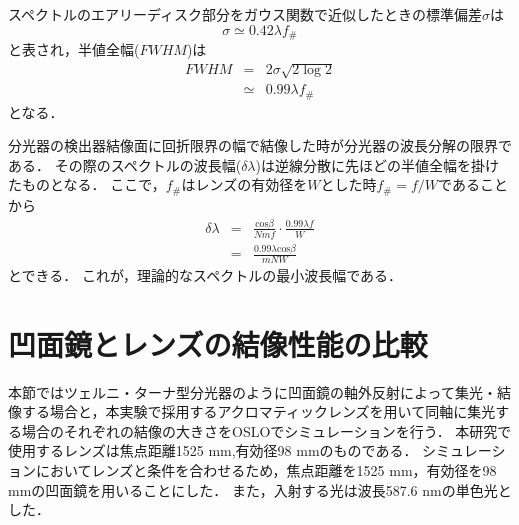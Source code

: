 スペクトルのエアリーディスク部分をガウス関数で近似したときの標準偏差$\sigma$は
\begin{equation}
     \sigma \simeq 0.42\lambda f_{\#}
\end{equation}
と表され\cite{airy_gauss}，半値全幅($FWHM$)は
\begin{eqnarray}
     FWHM &=& 2\sigma\sqrt{2\log2} \nonumber \\
     &\simeq&0.99\lambda f_{\#}
\end{eqnarray}
となる．




分光器の検出器結像面に回折限界の幅で結像した時が分光器の波長分解の限界である．
その際のスペクトルの波長幅($\delta\lambda$)は逆線分散に先ほどの半値全幅を掛けたものとなる．
ここで，$f_{\#}$はレンズの有効径を$W$とした時$f_{\#}=f/W$であることから
\begin{eqnarray}
     \delta\lambda &=& \frac{\mathrm{cos}{\beta}}{Nmf}\cdot\frac{0.99\lambda f}{W} \nonumber \\
     &=&\frac{0.99 \lambda \mathrm{cos}{\beta} }{mNW}
\end{eqnarray}
とできる．
これが，理論的なスペクトルの最小波長幅である．




\section{凹面鏡とレンズの結像性能の比較}
本節ではツェルニ・ターナ型分光器のように凹面鏡の軸外反射によって集光・結像する場合と，本実験で採用するアクロマティックレンズを用いて同軸に集光する場合のそれぞれの結像の大きさをOSLOでシミュレーションを行う．
本研究で使用するレンズは焦点距離1525 mm,有効径98 mmのものである．
シミュレーションにおいてレンズと条件を合わせるため，焦点距離を1525 mm，有効径を98 mmの凹面鏡を用いることにした．
また，入射する光は波長587.6 nmの単色光とした．


